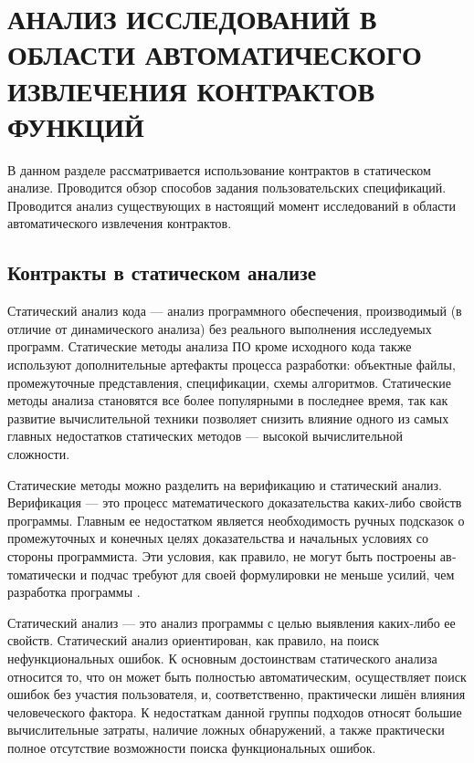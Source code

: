 \chapter{АНАЛИЗ ИССЛЕДОВАНИЙ В ОБЛАСТИ АВТОМАТИЧЕСКОГО ИЗВЛЕЧЕНИЯ КОНТРАКТОВ ФУНКЦИЙ}
\label{chapter:analysis}
В данном разделе рассматривается использование контрактов в статическом анализе. Проводится обзор способов задания пользовательских спецификаций. Проводится анализ существующих в настоящий момент исследований в области автоматического извлечения контрактов.

\section{Контракты в статическом анализе}
Статический анализ кода --- анализ программного обеспечения, производимый (в отличие от динамического анализа) без реального выполнения исследуемых программ. Статические методы анализа ПО кроме исходного кода также используют дополнительные артефакты процесса разработки: объектные файлы, промежуточные представления, спецификации, схемы алгоритмов. Статические методы анализа становятся все более популярными в последнее время, так как развитие вычислительной техники позволяет снизить влияние одного из самых главных недостатков статических методов --- высокой вычислительной сложности.

Статические методы можно разделить на верификацию и статический анализ. Верификация --- это процесс математического доказательства каких-либо свойств программы. Главным ее недостатком является необходимость ручных подсказок о промежуточных и конечных целях доказательства и начальных условиях со стороны программиста. Эти условия, как правило, не могут быть построены ав­томатически и подчас требуют для своей формулировки не меньше усилий, чем разработка программы .

Статический анализ --- это анализ программы с целью выявления каких-либо ее свойств. Статический анализ ориентирован, как правило, на поиск нефункциональных ошибок. К основным достоинствам статического анали­за относится то, что он может быть полностью автоматическим, осуществляет поиск ошибок без участия пользователя, и, соответствен­но, практически лишён влияния человеческого фактора.  К недостаткам данной группы подходов относят большие вычислительные затраты, наличие ложных обнаружений, а также практически полное отсутствие возможности поиска функциональных ошибок.

